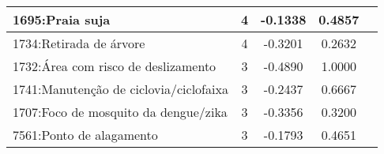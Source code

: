 \begin{table}[htbp]
\begin{tabular}{|l|c|c|c|c|}
		\hline
		1695:Praia suja                             & 4                & -0.1338        & 0.4857           \\
		\hline
		1734:Retirada de árvore                     & 4                & -0.3201        & 0.2632           \\
		\hline
		1732:Área com risco de deslizamento         & 3                & -0.4890        & 1.0000           \\
		\hline
		1741:Manutenção de ciclovia/ciclofaixa      & 3                & -0.2437        & 0.6667           \\
		\hline
		1707:Foco de mosquito da dengue/zika        & 3                & -0.3356        & 0.3200           \\
		\hline
		7561:Ponto de alagamento                    & 3                & -0.1793        & 0.4651           \\
		\hline
	\end{tabular}
\end{table}


